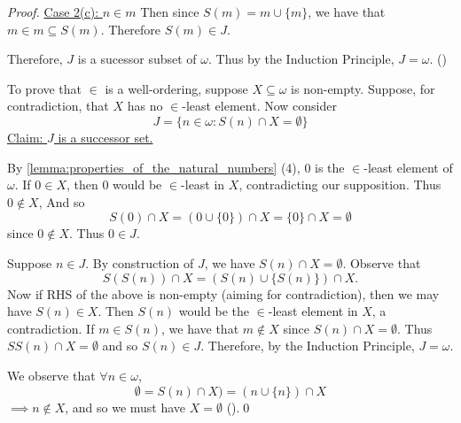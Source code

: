 \documentclass[notoc,notitlepage]{tufte-book}
\begin{document}
\begin{proof}
  \underline{Case 2(c): $n \in m$} Then since $S(m) = m \cup \{ m \}$, we have that $m \in m \subseteq S(m)$. Therefore $S(m) \in J$.

  Therefore, $J$ is a sucessor subset of $\omega$. Thus by the Induction Principle, $J = \omega$. ()

  To prove that $\in$ is a well-ordering, suppose $X \subseteq \omega$ is non-empty. Suppose, for contradiction, that $X$ has no $\in$-least element. Now consider
  \begin{equation*}
    J = \{ n \in \omega : S(n) \cap X = \emptyset \}
  \end{equation*}
  \noindent\underline{Claim: $J$ is a successor set.}

  By \cref{lemma:properties_of_the_natural_numbers} (4), $0$ is the $\in$-least element of $\omega$. If $0 \in X$, then $0$ would be $\in$-least in $X$, contradicting our supposition. Thus $0 \notin X$, And so
  \begin{equation*}
    S(0) \cap X = ( 0 \cup \{ 0 \} ) \cap X = \{ 0 \} \cap X = \emptyset
  \end{equation*}
  since $0 \notin X$. Thus $0 \in J$.

  Suppose $n \in J$. By construction of $J$, we have $S(n) \cap X = \emptyset$. Observe that
  \begin{equation*}
    S(S(n)) \cap X = ( S(n) \cup \{ S(n) \} ) \cap X.
  \end{equation*}
  Now if RHS of the above is non-empty (aiming for contradiction), then we may have $S(n) \in X$. Then $S(n)$ would be the $\in$-least element in $X$, a contradiction. If $m \in S(n)$, we have that $m \notin X$ since $S(n) \cap X = \emptyset$. Thus $SS(n) \cap X = \emptyset$ and so $S(n) \in J$. Therefore, by the Induction Principle, $J = \omega$.

  We observe that $\forall n \in \omega$,
  \begin{equation*}
    \emptyset = S(n) \cap X) = ( n \cup \{ n \} ) \cap X
  \end{equation*}
  $\implies n \notin X$, and so we must have $X = \emptyset$ ().\qed
\end{proof}
\end{document}
